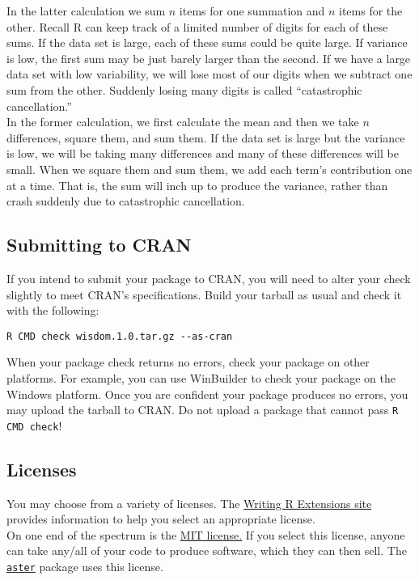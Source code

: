 \documentclass{article}
\begin{document}
 In the latter calculation we sum $n$ items for one summation and $n$ items for the other.  Recall  R can keep track of a limited number of digits for each of these sums. If the data set is large, each of these sums could be quite large. If  variance is low, the first sum may be just barely larger than the second. If we have a large data set with low variability, we will lose most of our digits when we subtract one sum from the other. Suddenly losing many digits is called ``catastrophic cancellation.''\\

In the former calculation, we first calculate the mean and then we take $n$ differences, square them, and sum them. If the data set is large but the variance is low, we will be taking many differences and many of these differences will be small. When we square them and sum them, we add each term's contribution one at a time. That is, the sum will inch up to produce the variance, rather than crash suddenly due to catastrophic cancellation.

\subsection{Submitting to CRAN} If you intend to submit your package to CRAN, you will need to alter your check slightly to meet CRAN's specifications. Build your tarball as usual and check it with the following:
\begin{verbatim}
R CMD check wisdom.1.0.tar.gz --as-cran
\end{verbatim}
When your package check returns no errors, check your package on other platforms. For example, you can use WinBuilder to check your package on the Windows platform. Once you are confident your package produces no errors, you may upload the tarball to CRAN. Do not upload a package that cannot pass \texttt{R CMD check}!


\subsection{Licenses}\label{sec:lic}
You may choose from a variety of licenses. The \href{https://cran.r-project.org/doc/manuals/R-exts.html#Licensing}{Writing R Extensions site} provides information to help you select an appropriate license. \\ 

On one end of the spectrum is the \href{https://cran.r-project.org/web/licenses/MIT}{MIT license.} If you select this license, anyone can take any/all of your code to produce software, which they can then sell. The \href{https://cran.r-project.org/web/packages/aster/index.html}{\texttt{aster}} package uses this license. \\
\end{document}
